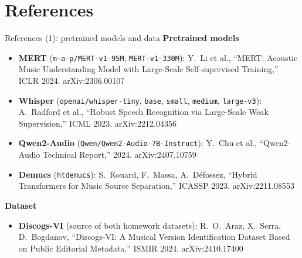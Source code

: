 \documentclass[aspectratio=169,11pt]{beamer}
\newenvironment{tight}{\begin{itemize}\setlength{\itemsep}{1.5pt}\setlength{\parskip}{0pt}\setlength{\topsep}{0pt}}{\end{itemize}}
\begin{document}
\section{References}
\begin{frame}[t]{References (1): pretrained models and data}
  \footnotesize
  \textbf{Pretrained models}
  \begin{tight}\footnotesize
    \item \textbf{MERT} (\texttt{m-a-p/MERT-v1-95M}, \texttt{MERT-v1-330M}): Y.~Li et al., ``MERT: Acoustic Music Understanding Model with Large-Scale Self-supervised Training,'' ICLR 2024. arXiv:2306.00107
    \item \textbf{Whisper} (\texttt{openai/whisper-tiny}, \texttt{base}, \texttt{small}, \texttt{medium}, \texttt{large-v3}): A.~Radford et al., ``Robust Speech Recognition via Large-Scale Weak Supervision,'' ICML 2023. arXiv:2212.04356
    \item \textbf{Qwen2-Audio} (\texttt{Qwen/Qwen2-Audio-7B-Instruct}): Y.~Chu et al., ``Qwen2-Audio Technical Report,'' 2024. arXiv:2407.10759
    \item \textbf{Demucs} (\texttt{htdemucs}): S.~Rouard, F.~Massa, A.~D\'efossez, ``Hybrid Transformers for Music Source Separation,'' ICASSP 2023. arXiv:2211.08553
  \end{tight}
  \vspace{0.5em}
  \textbf{Dataset}
  \begin{tight}\footnotesize
    \item \textbf{Discogs-VI} (source of both homework datasets): R.~O.~Araz, X.~Serra, D.~Bogdanov, ``Discogs-VI: A Musical Version Identification Dataset Based on Public Editorial Metadata,'' ISMIR 2024. arXiv:2410.17400
  \end{tight}
\end{frame}
\end{document}
